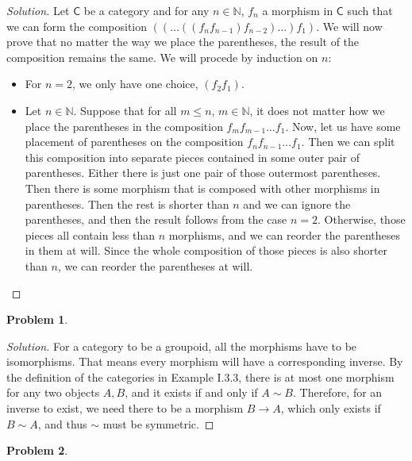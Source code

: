 \documentclass{article}
\theoremstyle{definition}
\newtheorem{problem-internal}{Problem}[subsection]
\newenvironment{problem}{
	\medskip
	\begin{problem-internal}
	}{
\end{problem-internal}
}
\newenvironment{solution}{
	\begin{proof}[Solution]
		\vspace{-8px}
		\setlength{\parskip}{4px}
		\setlength{\parindent}{0px}
	}{
\end{proof}
}
\newcommand{\C}{\mathsf{C}}
\begin{document}
\begin{solution}
	Let $\C$ be a category and for any $n \in \mathbb{N}$, $f_n$ a morphism in $\C$ such that we can form the composition $((\dots((f_{n}f_{n-1})f_{n-2})\dots)f_1)$. We will now prove that no matter the way we place the parentheses, the result of the composition remains the same. We will procede by induction on $n$:
	\begin{itemize}
		\item For $n=2$, we only have one choice, $(f_2f_1)$.
		\item Let $n \in \mathbb{N}$. Suppose that for all $m \leq n$, $m \in \mathbb{N}$, it does not matter how we place the parentheses in the composition $f_mf_{m-1}\dots f_1$. Now, let us have some placement of parentheses on the composition $f_nf_{n-1}\dots f_1$. Then we can split this composition into separate pieces contained in some outer pair of parentheses. Either there is just one pair of those outermost parentheses. Then there is some morphism that is composed with other morphisms in parentheses. Then the rest is shorter than $n$ and we can ignore the parentheses, and then the result follows from the case $n=2$. Otherwise, those pieces all contain less than $n$ morphisms, and we can reorder the parentheses in them at will. Since the whole composition of those pieces is also shorter than $n$, we can reorder the parentheses at will.
	\end{itemize}
\end{solution}

\begin{problem}
\end{problem}

\begin{solution}
	For a category to be a groupoid, all the morphisms have to be isomorphisms. That means every morphism will have a corresponding inverse. By the definition of the categories in Example I.3.3, there is at most one morphism for any two objects $A, B$, and it exists if and only if $A \sim B$. Therefore, for an inverse to exist, we need there to be a morphism $B \to A$, which only exists if $B \sim A$, and thus $\sim$ must be symmetric.
\end{solution}

\begin{problem}
\end{problem}
\end{document}
